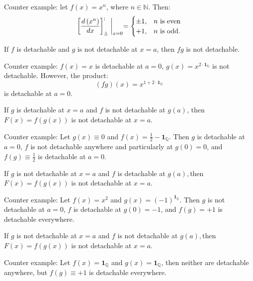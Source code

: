 \documentclass[11pt]{book}
\begin{document}
Counter example: let $f\left(x\right)=x^{n}$, where $n\in\mathbb{N}$.
Then:
\[
\left[\frac{d\left(x^{n}\right)}{dx}\right]_{\pm}^{;}\biggm\lvert_{x=0}=\begin{cases}
\pm1, & n\text{ is even}\\
+1, & n\text{ is odd}.
\end{cases}
\]

\begin{exercise}If $f$ is detachable and $g$ is not detachable at $x=a$, then
$fg$ is not detachable.
\end{exercise}

Counter example: $f\left(x\right)=x$ is detachable at $a=0$,
$g\left(x\right)=x^{2\cdot\boldsymbol{1}_{\mathbb{Q}}}$ is not detachable. However, the product:
\[
\left(fg\right)\left(x\right)=x^{1+2\cdot\boldsymbol{1}_{\mathbb{Q}}}
\]
is detachable at $a=0$.

\begin{exercise}If $g$ is detachable at $x=a$ and $f$ is not detachable at
$g\left(a\right)$, then $F\left(x\right)=f\left(g\left(x\right)\right)$
is not detachable at $x=a$.
\end{exercise}

Counter example: Let $g\left(x\right)\equiv0$ and $f\left(x\right)=\frac{1}{2}-\boldsymbol{1}_{\mathbb{Q}}$.
Then $g$ is detachable at $a=0$, $f$ is not detachable anywhere
and particularly at $g\left(0\right)=0$, and $f\left(g\right)\equiv\frac{1}{2}$
is detachable at $a=0$.

\begin{exercise}If $g$ is not detachable at $x=a$ and $f$ is detachable at
$g\left(a\right),$then $F\left(x\right)=f\left(g\left(x\right)\right)$
is not detachable at $x=a$.
\end{exercise}

Counter example: Let $f\left(x\right)=x^{2}$ and $g\left(x\right)=\left(-1\right)^{\boldsymbol{1}_{\mathbb{Q}}}$.
Then $g$ is not detachable at $a=0$, $f$ is detachable at $g\left(0\right)=-1$,
and $f\left(g\right)=+1$ is detachable everywhere.

\begin{exercise}If $g$ is not detachable at $x=a$ and $f$ is not detachable
at $g\left(a\right),$then $F\left(x\right)=f\left(g\left(x\right)\right)$
is not detachable at $x=a$.
\end{exercise}

Counter example: Let $f\left(x\right)=\boldsymbol{1}_{\mathbb{Q}}$
and $g\left(x\right)=\boldsymbol{1}_{\mathbb{Q}}$, then neither are
detachable anywhere, but $f\left(g\right)\equiv+1$ is detachable
everywhere.
\end{document}
